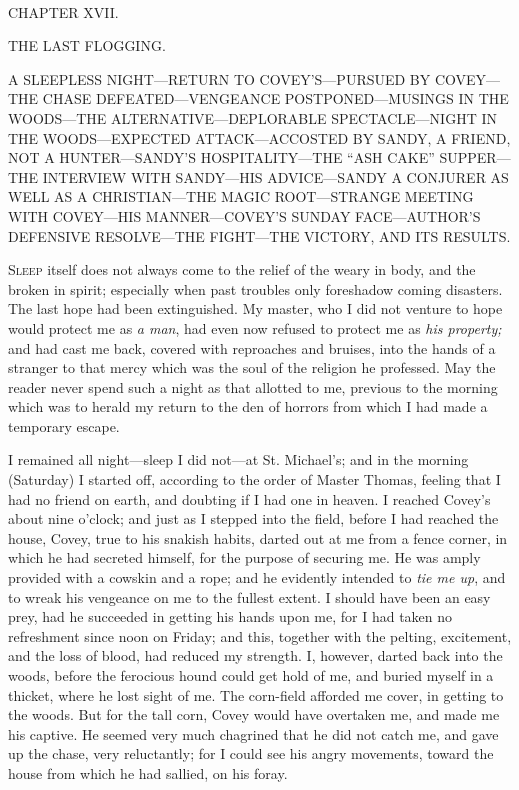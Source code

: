 {\protect\hypertarget{233}{}{}}

~

{CHAPTER XVII.}

THE LAST FLOGGING.

{A SLEEPLESS NIGHT---RETURN TO COVEY'S---PURSUED BY COVEY---THE CHASE
DEFEATED---VENGEANCE POSTPONED---MUSINGS IN THE WOODS---THE
ALTERNATIVE---DEPLORABLE SPECTACLE---NIGHT IN THE WOODS---EXPECTED
ATTACK---ACCOSTED BY SANDY, A FRIEND, NOT A HUNTER---SANDY'S
HOSPITALITY---THE ``ASH CAKE'' SUPPER---THE INTERVIEW WITH SANDY---HIS
ADVICE---SANDY A CONJURER AS WELL AS A CHRISTIAN---THE MAGIC
ROOT---STRANGE MEETING WITH COVEY---HIS MANNER---COVEY'S SUNDAY
FACE---AUTHOR'S DEFENSIVE RESOLVE---THE FIGHT---THE VICTORY, AND ITS
RESULTS.}

\textsc{Sleep} itself does not always come to the relief of the weary in
body, and the broken in spirit; especially when past troubles only
foreshadow coming disasters. The last hope had been extinguished. My
master, who I did not venture to hope would protect me as \emph{a man},
had even now refused to protect me as \emph{his property;} and had cast
me back, covered with reproaches and bruises, into the hands of a
stranger to that mercy which was the soul of the religion he professed.
May the reader never spend such a night as that allotted to me, previous
to the morning which was to herald my return to the den of horrors from
which I had made a temporary escape.

I remained all night---sleep I did not---at St. Michael's; and in the
morning (Saturday) I started off, according to the order of Master
Thomas, feeling that {\protect\hypertarget{234}{}{}}I had no friend on
earth, and doubting if I had one in heaven. I reached Covey's about nine
o'clock; and just as I stepped into the field, before I had reached the
house, Covey, true to his snakish habits, darted out at me from a fence
corner, in which he had secreted himself, for the purpose of securing
me. He was amply provided with a cowskin and a rope; and he evidently
intended to \emph{tie me up}, and to wreak his vengeance on me to the
fullest extent. I should have been an easy prey, had he succeeded in
getting his hands upon me, for I had taken no refreshment since noon on
Friday; and this, together with the pelting, excitement, and the loss of
blood, had reduced my strength. I, however, darted back into the woods,
before the ferocious hound could get hold of me, and buried myself in a
thicket, where he lost sight of me. The corn-field afforded me cover, in
getting to the woods. But for the tall corn, Covey would have overtaken
me, and made me his captive. He seemed very much chagrined that he did
not catch me, and gave up the chase, very reluctantly; for I could see
his angry movements, toward the house from which he had sallied, on his
foray.

